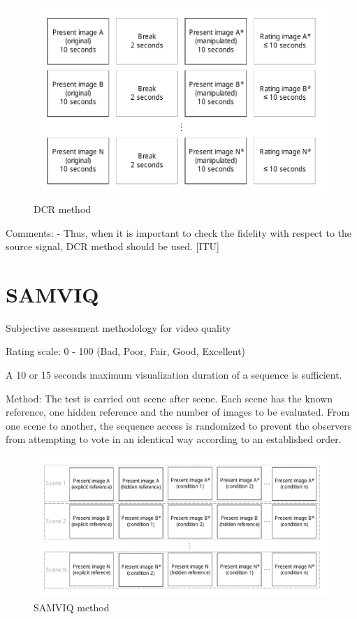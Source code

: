 \begin{figure}[H]
	\centering
	\includegraphics[width = \columnwidth]{Img/DCR}
	\caption{DCR method}
	\label{fig:dcrMethod}
\end{figure}

Comments:
 - Thus, when it is important to check the fidelity with respect to the source signal, DCR method should be used. [ITU]


\section{SAMVIQ} %
\label{sec:samviq}

Subjective assessment methodology for video quality

Rating scale: 0 - 100 (Bad, Poor, Fair, Good, Excellent)

A 10 or 15 seconds maximum visualization duration of a sequence is sufficient.

Method: The test is carried out scene after scene. Each scene has the known reference, one hidden reference and the number of images to be evaluated. From one scene to another, the sequence access is randomized to prevent the observers from attempting to vote in an identical way according to an established order.

\begin{figure}[H]
	\centering
	\includegraphics[width = \columnwidth]{Img/SAMVIQ}
	\caption{SAMVIQ method}
	\label{fig:samviqMethod}
\end{figure}

